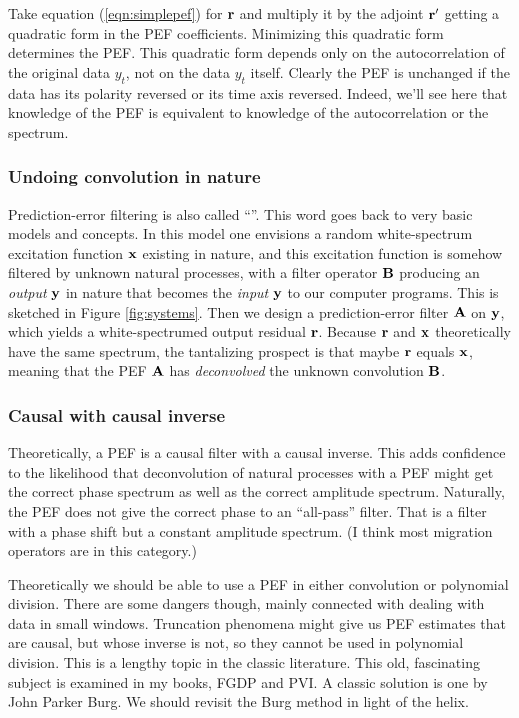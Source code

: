 \par
Take equation  (\ref{eqn:simplepef}) for $\bold r$ and multiply it
by the adjoint $\bold r'$ getting a quadratic form in the PEF
coefficients.  Minimizing this quadratic form determines the PEF.
This quadratic form depends only on the autocorrelation
of the original data $y_t$, not on the data $y_t$ itself.
Clearly the PEF is unchanged if the data has its polarity reversed
or its time axis reversed.
Indeed, we'll see here that knowledge of the PEF
is equivalent to knowledge of the autocorrelation or the spectrum.


\subsubsection{Undoing convolution in nature}
Prediction-error filtering is also called ``''.
This word goes back to very basic models and concepts.
In this model one envisions
a random white-spectrum excitation function $\bold x$
existing in nature, and this excitation function
is somehow filtered by unknown natural processes,
with a filter operator $\bold B$
producing an {\it output} $\bold y$ in nature
that becomes the {\it input} $\bold y$
to our computer programs.
This is sketched in Figure \ref{fig:systems}.
Then we design a prediction-error filter $\bold A$ on $\bold y$,
which yields a white-spectrumed output residual $\bold r$.
Because $\bold r$ and $\bold x$ theoretically have the same spectrum,
the tantalizing prospect is that maybe $\bold r$ equals $\bold x$,
meaning that the PEF $\bold A$ has {\it deconvolved}
the unknown convolution $\bold B$.

\subsubsection{Causal with causal inverse}
Theoretically, a PEF is a causal filter with a causal inverse.
This adds confidence to the likelihood that deconvolution
of natural processes with a PEF might get the correct phase spectrum
as well as the correct amplitude spectrum.
Naturally, the PEF does not give the correct phase to an ``all-pass'' filter.
That is a filter with a phase shift but a constant amplitude spectrum.
(I think most migration operators are in this category.)

\par
Theoretically we should be able to use a PEF
in either convolution or polynomial division.
There are some dangers though,
mainly connected with dealing with data in small windows.
Truncation phenomena might give us PEF estimates
that are causal, but whose inverse is not,
so they cannot be used in polynomial division.
This is a lengthy topic in the classic literature.
This old, fascinating subject is examined in my books, FGDP and PVI.
A classic solution is one by John Parker Burg.
We should revisit the Burg method in light of the helix.

